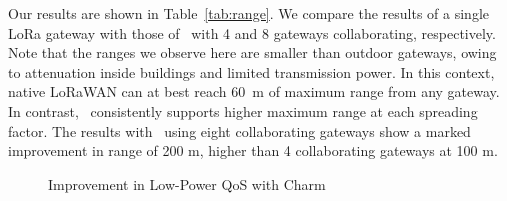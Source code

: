 Our results are shown in Table~\ref{tab:range}. We compare the results of a single LoRa gateway with those of \name\ with 4 and 8 gateways collaborating, respectively. Note that the ranges we observe here are smaller than outdoor gateways, owing to attenuation inside buildings and limited transmission power. In this context, native LoRaWAN can at best reach 60~m of maximum range from any gateway. In contrast, \name\ consistently supports higher maximum range at each spreading factor. The results with \name\ using eight collaborating gateways show a marked improvement in range of 200 m, higher than 4 collaborating gateways at 100 m.



\begin{figure}[htb]
\centering
{} \hfill
{} \hfill
{}
\compactimg
\caption{Improvement in Low-Power QoS with Charm}
\label{fig:charm-improvement}
\compactimg
\end{figure}


